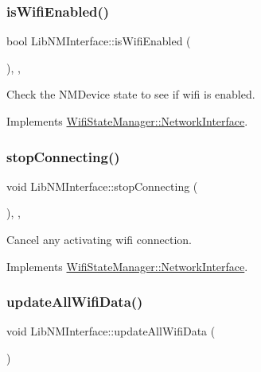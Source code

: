 \subsubsection{\texorpdfstring{is\+Wifi\+Enabled()}{isWifiEnabled()}}
{\footnotesize\ttfamily bool Lib\+N\+M\+Interface\+::is\+Wifi\+Enabled (\begin{DoxyParamCaption}{ }\end{DoxyParamCaption})\hspace{0.3cm}{\ttfamily [override]}, {\ttfamily [protected]}, {\ttfamily [virtual]}}

Check the N\+M\+Device state to see if wifi is enabled. 

Implements \mbox{\hyperlink{classWifiStateManager_1_1NetworkInterface_aefcafd5baac9715524c60d65b0f523ce}{Wifi\+State\+Manager\+::\+Network\+Interface}}.

\mbox{\label{classLibNMInterface_a46a4b026d110f3f397bd74aa413a6276}} 
\subsubsection{\texorpdfstring{stop\+Connecting()}{stopConnecting()}}
{\footnotesize\ttfamily void Lib\+N\+M\+Interface\+::stop\+Connecting (\begin{DoxyParamCaption}{ }\end{DoxyParamCaption})\hspace{0.3cm}{\ttfamily [override]}, {\ttfamily [protected]}, {\ttfamily [virtual]}}

Cancel any activating wifi connection. 

Implements \mbox{\hyperlink{classWifiStateManager_1_1NetworkInterface_a201033fbed61d18311773c3035806fc0}{Wifi\+State\+Manager\+::\+Network\+Interface}}.

\mbox{\label{classLibNMInterface_afdb4daa97cc16cd38b154921969c4237}} 
\subsubsection{\texorpdfstring{update\+All\+Wifi\+Data()}{updateAllWifiData()}}
{\footnotesize\ttfamily void Lib\+N\+M\+Interface\+::update\+All\+Wifi\+Data (\begin{DoxyParamCaption}{ }\end{DoxyParamCaption})\hspace{0.3cm}{\ttfamily [protected]}}

